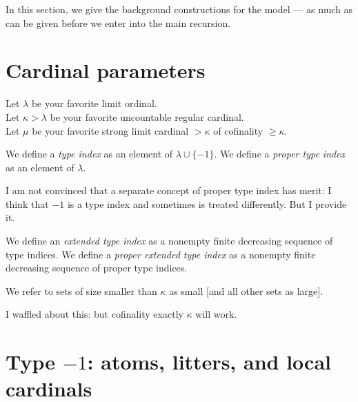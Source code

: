 In this section, we give the background constructions for the model — as much as can be given before we enter into the main recursion.

\section{Cardinal parameters}

\begin{definition}
\label {def:params}
\leanok
{}
Let $\lambda$ be your favorite limit ordinal. \\
Let $\kappa>\lambda$ be your favorite uncountable regular cardinal. \\
Let $\mu$ be your favorite strong limit cardinal $>\kappa$ of cofinality $\geq \kappa$.
\end{definition}

\begin{definition}
\label {def:type-index}
\leanok
{}
We define a {\em type index} as an element of $\lambda \cup \{-1\}$.
We define a {\em proper type index} as an element of $\lambda$.
\end{definition}

I am not convinced that a separate concept of proper type index has merit:  I think that $-1$ is a type index and sometimes is treated differently.  But I provide it.

\begin{definition}
\label {def:extended-type-index}
\leanok
{}
We define an {\em extended type index} as a nonempty finite decreasing sequence of type indices.
We define a {\em proper extended type index} as a nonempty finite decreasing sequence of proper type indices.
\end{definition}

\begin{definition}
\label {def:small}
\leanok
{}
We refer to sets of size smaller than $\kappa$ as small [and all other sets as large].
\end{definition}

I waffled about this:  but cofinality exactly $\kappa$ will work.

\section{Type $-1$: atoms, litters, and local cardinals}

